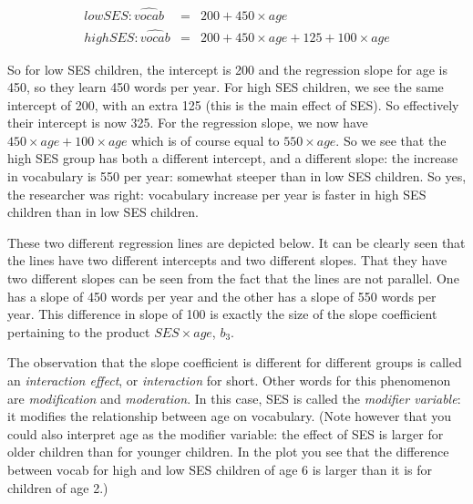 \begin{eqnarray}
low SES: \widehat{vocab} &=&  200 + 450 \times age   \\
high SES: \widehat{vocab} &=& 200 + 450 \times age + 125  + 100   \times age
\end{eqnarray}

So for low SES children, the intercept is 200 and the regression slope for age is 450, so they learn 450 words per year. For high SES children, we see the same intercept of 200, with an extra 125 (this is the main effect of SES). So effectively their intercept is now 325. For the regression slope, we now have $450 \times age+ 100   \times age$ which is of course equal to $550 \times age$. So we see that the high SES group has both a different intercept, and a different slope: the increase in vocabulary is 550 per year: somewhat steeper than in low SES children. So yes, the researcher was right: vocabulary increase per year is faster in high SES children than in low SES children.

These two different regression lines are depicted below. It can be clearly seen that the lines have two different intercepts and two different slopes. That they have two different slopes can be seen from the fact that the lines are not parallel. One has a slope of 450 words per year and the other has a slope of 550 words per year. This difference in slope of 100 is exactly the size of the slope coefficient pertaining to the product $SES \times age$, $b_3$. 

\begin{knitrout}
\color{fgcolor}\begin{kframe}


{\ttfamily\noindent\bfseries{}}\end{kframe}
\end{knitrout}


The observation that the slope coefficient is different for different groups is called an \textit{interaction effect}, or \textit{interaction} for short. Other words for this phenomenon are \textit{modification} and \textit{moderation}. In this case, SES is called the \textit{modifier variable}: it modifies the relationship between age on vocabulary. (Note however that you could also interpret age as the modifier variable: the effect of SES is larger for older children than for younger children. In the plot you see that the difference between vocab for high and low SES children of age 6 is larger than it is for children of age 2.)

